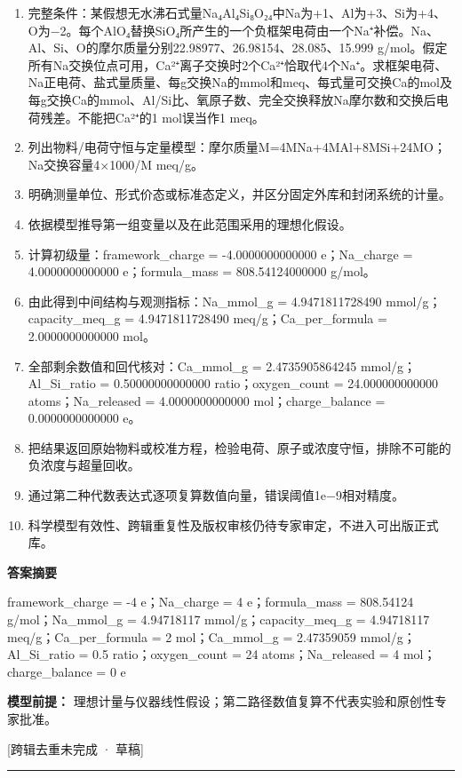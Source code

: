 \documentclass[UTF8,11pt,a4paper]{ctexart}
\begin{document}
\begin{enumerate}
\item 完整条件：某假想无水沸石式量Na₄Al₄Si₈O₂₄中Na为+1、Al为+3、Si为+4、O为−2。每个AlO₄替换SiO₄所产生的一个负框架电荷由一个Na⁺补偿。Na、Al、Si、O的摩尔质量分别22.98977、26.98154、28.085、15.999 g/mol。假定所有Na交换位点可用，Ca²⁺离子交换时2个Ca²⁺恰取代4个Na⁺。求框架电荷、Na正电荷、盐式量质量、每g交换Na的mmol和meq、每式量可交换Ca的mol及每g交换Ca的mmol、Al/Si比、氧原子数、完全交换释放Na摩尔数和交换后电荷残差。不能把Ca²⁺的1 mol误当作1 meq。
\item 列出物料/电荷守恒与定量模型：摩尔质量M=4MNa+4MAl+8MSi+24MO；Na交换容量4×1000/M meq/g。
\item 明确测量单位、形式价态或标准态定义，并区分固定外库和封闭系统的计量。
\item 依据模型推导第一组变量以及在此范围采用的理想化假设。
\item 计算初级量：framework\_charge = -4.0000000000000 e；Na\_charge = 4.0000000000000 e；formula\_mass = 808.54124000000 g/mol。
\item 由此得到中间结构与观测指标：Na\_mmol\_g = 4.9471811728490 mmol/g；capacity\_meq\_g = 4.9471811728490 meq/g；Ca\_per\_formula = 2.0000000000000 mol。
\item 全部剩余数值和回代核对：Ca\_mmol\_g = 2.4735905864245 mmol/g；Al\_Si\_ratio = 0.50000000000000 ratio；oxygen\_count = 24.000000000000 atoms；Na\_released = 4.0000000000000 mol；charge\_balance = 0.0000000000000 e。
\item 把结果返回原始物料或校准方程，检验电荷、原子或浓度守恒，排除不可能的负浓度与超量回收。
\item 通过第二种代数表达式逐项复算数值向量，错误阈值1e−9相对精度。
\item 科学模型有效性、跨辑重复性及版权审核仍待专家审定，不进入可出版正式库。
\end{enumerate}
\noindent\textbf{答案摘要}\par
framework\_charge = -4 e；Na\_charge = 4 e；formula\_mass = 808.54124 g/mol；Na\_mmol\_g = 4.94718117 mmol/g；capacity\_meq\_g = 4.94718117 meq/g；Ca\_per\_formula = 2 mol；Ca\_mmol\_g = 2.47359059 mmol/g；Al\_Si\_ratio = 0.5 ratio；oxygen\_count = 24 atoms；Na\_released = 4 mol；charge\_balance = 0 e\par
\noindent\textbf{模型前提：}
理想计量与仪器线性假设；第二路径数值复算不代表实验和原创性专家批准。\par
\noindent\textcolor{red!65!black}{[跨辑去重未完成 · 草稿]} \par
\medskip\hrule\medskip
{}
\end{document}

